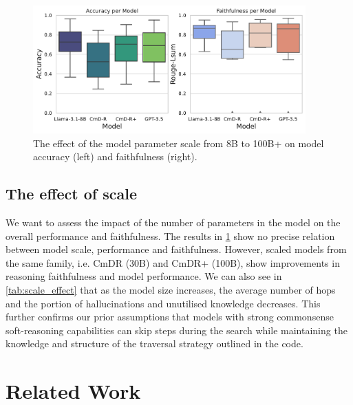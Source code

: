 \documentclass{article} %
\begin{document}
\begin{figure}[t!]
    \centering
    \includegraphics[clip=true,width=0.935\textwidth]{figures/effect_of_scale.pdf}
    \caption{The effect of the model parameter scale from 8B to 100B+ on model accuracy (left) and faithfulness (right).}
    \label{fig:effect_of_scale}
\end{figure}

\subsection{The effect of scale}


We want to assess the impact of the number of parameters in the model on the overall performance and faithfulness. The results in \cref{fig:effect_of_scale} show no precise relation between model scale, performance and faithfulness. However, scaled models from the same family, i.e. CmDR (30B) and CmDR+ (100B), show improvements in reasoning faithfulness and model performance. We can also see in  \cref{tab:scale_effect} that as the model size increases, the average number of hops and the portion of hallucinations and unutilised knowledge decreases. This further confirms our prior assumptions that models with strong commonsense soft-reasoning capabilities can skip steps during the search while maintaining the knowledge and structure of the traversal strategy outlined in the code. 

\section{Related Work}
\label{sec:related}
\end{document}
